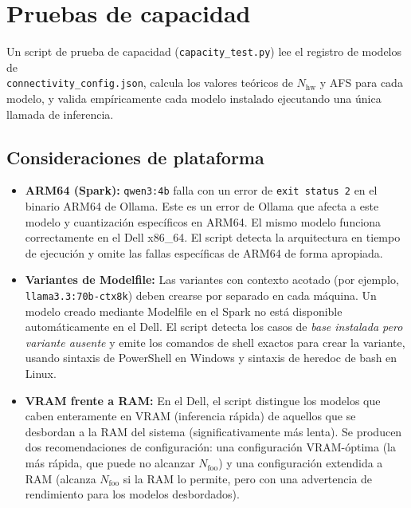 \section{Pruebas de capacidad}
\label{sec:capacity}

Un script de prueba de capacidad (\texttt{capacity\_test.py}) lee el
registro de modelos de \\
\texttt{connectivity\_config.json}, calcula los
valores teóricos de $N_{\text{hw}}$ y AFS para cada modelo, y valida
empíricamente cada modelo instalado ejecutando una única llamada de
inferencia.

\subsection{Consideraciones de plataforma}

\begin{itemize}
  \item \textbf{ARM64 (Spark):} \texttt{qwen3:4b} falla con un error de
        \texttt{exit~status~2} en el binario ARM64 de Ollama. Este es un
        error de Ollama que afecta a este modelo y cuantización
        específicos en ARM64. El mismo modelo funciona correctamente en
        el Dell x86\_64. El script detecta la arquitectura en tiempo de
        ejecución y omite las fallas específicas de ARM64 de forma
        apropiada.

  \item \textbf{Variantes de Modelfile:} Las variantes con contexto
        acotado (por ejemplo, \texttt{llama3.3:70b-ctx8k}) deben crearse
        por separado en cada máquina. Un modelo creado mediante Modelfile
        en el Spark no está disponible automáticamente en el Dell. El
        script detecta los casos de \emph{base instalada pero variante
        ausente} y emite los comandos de shell exactos para crear la
        variante, usando sintaxis de PowerShell en Windows y sintaxis de
        heredoc de bash en Linux.

  \item \textbf{VRAM frente a RAM:} En el Dell, el script distingue los
        modelos que caben enteramente en VRAM (inferencia rápida) de
        aquellos que se desbordan a la RAM del sistema (significativamente
        más lenta). Se producen dos recomendaciones de configuración: una
        configuración VRAM-óptima (la más rápida, que puede no alcanzar
        $N_{\text{foo}}$) y una configuración extendida a RAM (alcanza
        $N_{\text{foo}}$ si la RAM lo permite, pero con una advertencia
        de rendimiento para los modelos desbordados).
\end{itemize}

